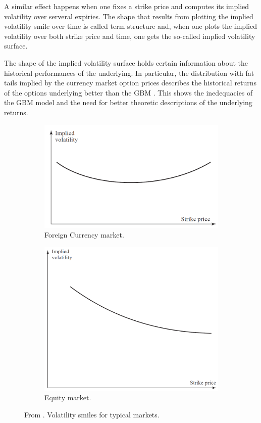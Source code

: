 \documentclass[12,twoside]{mammeTFM}
\theoremstyle{definition}
\theoremstyle{remark}
\begin{document}
A similar effect happens when one fixes a strike price and computes its implied volatility over serveral expiries. The shape that results from plotting the implied volatility smile over time is called term structure and, when one plots the implied volatility over both strike price and time, one gets the so-called implied volatility surface.

The shape of the implied volatility surface holds certain information about the historical performances of the underlying. In particular, the distribution with fat tails implied by the currency market option prices describes the historical returns of the options underlying better than the GBM \cite{hul09}. This shows the inedequacies of the GBM model and the need for better theoretic descriptions of the underlying returns.

\begin{figure}
\centering
\begin{subfigure}{.5\textwidth}
  \centering
  \includegraphics[width=.9\linewidth]{Media/currency_smile.PNG}
  \caption{Foreign Currency market.}
\end{subfigure}%
\begin{subfigure}{.5\textwidth}
  \centering
  \includegraphics[width=.65\linewidth]{Media/equity_smile.PNG}
  \caption{Equity market.}
\end{subfigure}
\caption{From \cite{hul09}. Volatility smiles for typical markets.}
\label{fig:smile}
\end{figure}
\end{document}
